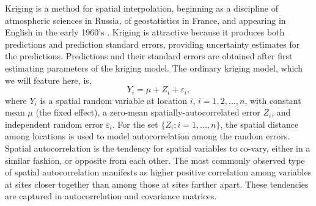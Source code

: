 \documentclass[11pt, titlepage]{article}\usepackage[]{graphicx}\usepackage[]{color}
\begin{document}
\begin{spacing}{1.9}
\begin{flushleft}
Kriging is a method for spatial interpolation, beginning as a discipline of atmospheric sciences in Russia, of geostatistics in France, and appearing in English in the early 1960's \citep{Gand:obje:1963, Math:Prin:1963,Cres:orig:1990}.  Kriging is attractive because it produces both predictions and prediction standard errors, providing uncertainty estimates for the predictions. Predictions and their standard errors are obtained after first estimating parameters of the kriging model.  The ordinary kriging model, which we will feature here, is,
\begin{equation} \label{eq:OKmodel}
    Y_i = \mu + Z_i + \varepsilon_i,
\end{equation}
where $Y_i$ is a spatial random variable at location $i$, $i = 1,2,\ldots,n$, with constant mean $\mu$ (the fixed effect), a zero-mean spatially-autocorrelated error $Z_i$, and independent random error $ \varepsilon_i$. For the set $\{Z_i; i = 1,\ldots,n\}$, the spatial distance among locations is used to model autocorrelation among the random errors. Spatial autocorrelation is the tendency for spatial variables to co-vary, either in a similar fashion, or opposite from each other.  The most commonly observed type of spatial autocorrelation manifests as higher positive correlation among variables at sites closer together than among those at sites farther apart.  These tendencies are captured in autocorrelation and covariance matrices. 


\end{flushleft}
\end{spacing}
\end{document}
